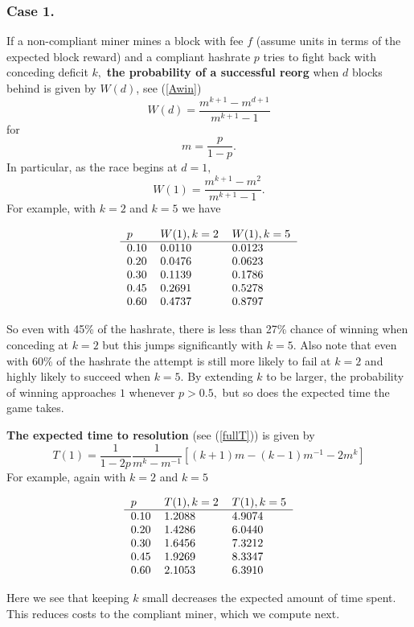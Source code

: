 \documentclass{article}%
\begin{document}
\subsubsection{Case 1.}

If a non-compliant miner mines a block with fee $f$ (assume units in terms of
the expected block reward) and a compliant hashrate $p$ tries to fight back
with conceding deficit $k,$ \textbf{the probability of a successful reorg}
when $d$ blocks behind is given by $W(d)$, see (\ref{Awin})
\[
W(d)=\frac{m^{k+1}-m^{d+1}}{m^{k+1}-1}%
\]
for
\[
m=\frac{p}{1-p}.
\]
In particular, as the race begins at $d=1,$  \
\[
W(1)=\frac{m^{k+1}-m^{2}}{m^{k+1}-1} .%
\]
For example, with $k=2$ and $k=5$ we have%

\[ \begin{tabular}[c]{lll} $p$ & $W(1),k=2$ & $W(1),k=5$\\ \hline $0.10$ & $0.0110$ & $0.0123$\\ $0.20$ & $0.0476$ & $0.0623$\\ $0.30$ & $0.1139$ & $0.1786$\\ $0.45$ & $0.2691$ & $0.5278$\\ $0.60$ & $0.4737$ & $0.8797$ \end{tabular} \]

So even with 45\% of the hashrate, there is less than 27\% chance of winning
when conceding at $k=2$ but this jumps significantly with $k=5.$  Also note
that even with 60\% of the hashrate the attempt is still more likely to fail
at $k=2$ and highly likely to succeed when $k=5.$  By extending $k$ to be
larger, the probability of winning approaches $1$ whenever $p>0.5,$ but so
does the expected time the game takes. 

 \textbf{The expected time to resolution} (see (\ref{fullT})) is given
by
\[
T(1)=\frac{1}{1-2p}\frac{1}{m^{k}-m^{-1}}\left[  \left(  k+1\right)
m-(k-1)m^{-1}-2m^{k}\right]
\]
For example, again with $k=2$ and $k=5$%


\[ \begin{tabular}[c]{lll} $p$ & $T(1),k=2$ & $T(1),k=5$\\ \hline $0.10$ & $1.2088$ & $4.9074$\\ $0.20$ & $1.4286$ & $6.0440$\\ $0.30$ & $1.6456$ & $7.3212$\\ $0.45$ & $1.9269$ & $8.3347$\\ $0.60$ & $2.1053$ & $6.3910$ \end{tabular} \]


Here we see that keeping $k$ small decreases the expected amount of time
spent.  This reduces costs to the compliant miner, which we compute next.
\end{document}
